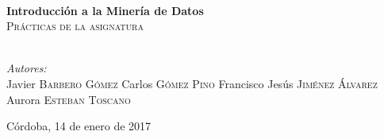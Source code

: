 \begin{titlepage}
  \HRule \\[0.4cm]
  { \huge \bfseries Introducción a la Minería de Datos}\\[0.4cm] %
  \textsc{\large Prácticas de la asignatura}\\[0.5cm]
  \HRule \\[1.5cm]
  
  
      \begin{minipage}{0.4\textwidth}
        \begin{flushleft} \large
          \emph{Autores:}\\
          Javier \textsc{Barbero Gómez}
          Carlos \textsc{Gómez Pino}
          Francisco Jesús \textsc{Jiménez Álvarez}
          Aurora \textsc{Esteban Toscano}
        \end{flushleft}
      \end{minipage}
  


{\large Córdoba, 14 de enero de 2017}\\[2cm] %




\vfill %

\end{titlepage}
